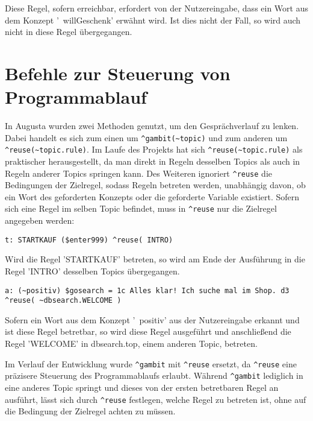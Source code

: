 Diese Regel, sofern erreichbar, erfordert von der Nutzereingabe, dass ein Wort aus dem Konzept '~willGeschenk' erwähnt wird. Ist dies nicht der Fall, so wird auch nicht in diese Regel übergegangen.


\section{Befehle zur Steuerung von Programmablauf}
\label{sec:ChatScript: Befehle zur Steuerung von Programmablauf}

In Augusta wurden zwei Methoden genutzt, um den Gesprächverlauf zu lenken. Dabei handelt es sich zum einen um \lstinline|^gambit(~topic)| und zum anderen um \lstinline|^reuse(~topic.rule)|. Im Laufe des Projekts hat sich \lstinline|^reuse(~topic.rule)| als praktischer herausgestellt, da man direkt in Regeln desselben Topics als auch in Regeln anderer Topics springen kann. Des Weiteren ignoriert \lstinline|^reuse| die Bedingungen der Zielregel, sodass Regeln betreten werden, unabhängig davon, ob ein Wort des geforderten Konzepts oder die geforderte Variable existiert. Sofern sich eine Regel im selben Topic befindet, muss in \lstinline|^reuse| nur die Zielregel angegeben werden:

\begin{lstlisting}[caption={Regel STARTKAUF in kaufabsicht.top}]
t: STARTKAUF ($enter999) ^reuse( INTRO)
\end{lstlisting}

Wird die Regel 'STARTKAUF' betreten, so wird am Ende der Ausführung in die Regel 'INTRO' desselben Topics übergegangen. 

\begin{lstlisting}[caption={Regel in keyexonesentence.top}]
a: (~positiv) $gosearch = 1c Alles klar! Ich suche mal im Shop. d3 ^reuse( ~dbsearch.WELCOME )
\end{lstlisting}

Sofern ein Wort aus dem Konzept '~positiv' aus der Nutzereingabe erkannt und ist diese Regel betretbar, so wird diese Regel ausgeführt und anschließend die Regel 'WELCOME' in dbsearch.top, einem anderen Topic, betreten.

Im Verlauf der Entwicklung wurde \lstinline|^gambit| mit \lstinline|^reuse| ersetzt, da \lstinline|^reuse| eine präzisere Steuerung des Programmablaufs erlaubt. Während \lstinline|^gambit| lediglich in eine anderes Topic springt und dieses von der ersten betretbaren Regel an ausführt, lässt sich durch \lstinline|^reuse| festlegen, welche Regel zu betreten ist, ohne auf die Bedingung der Zielregel achten zu müssen.  


